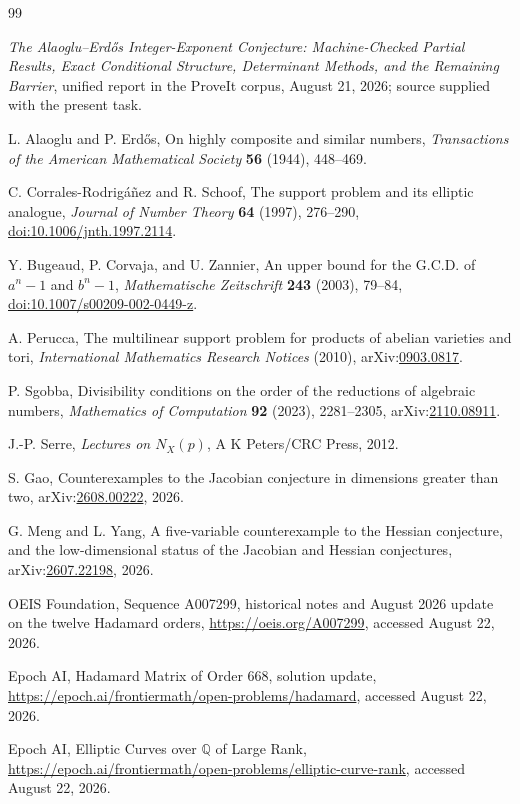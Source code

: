 \documentclass[11pt]{article}
\theoremstyle{definition}
\newcommand{\Q}{\mathbb Q}
\begin{document}
\begin{thebibliography}{99}

\emph{The Alaoglu--Erd\H{o}s Integer-Exponent Conjecture: Machine-Checked Partial Results,
Exact Conditional Structure, Determinant Methods, and the Remaining Barrier}, unified report
in the ProveIt corpus, August 21, 2026; source supplied with the present task.

L. Alaoglu and P. Erd\H{o}s,
On highly composite and similar numbers,
\emph{Transactions of the American Mathematical Society} \textbf{56} (1944), 448--469.

C. Corrales-Rodrig\'a\~nez and R. Schoof,
The support problem and its elliptic analogue,
\emph{Journal of Number Theory} \textbf{64} (1997), 276--290,
\href{https://doi.org/10.1006/jnth.1997.2114}{doi:10.1006/jnth.1997.2114}.

Y. Bugeaud, P. Corvaja, and U. Zannier,
An upper bound for the G.C.D. of $a^n-1$ and $b^n-1$,
\emph{Mathematische Zeitschrift} \textbf{243} (2003), 79--84,
\href{https://doi.org/10.1007/s00209-002-0449-z}{doi:10.1007/s00209-002-0449-z}.

A. Perucca,
The multilinear support problem for products of abelian varieties and tori,
\emph{International Mathematics Research Notices} (2010),
arXiv:\href{https://arxiv.org/abs/0903.0817}{0903.0817}.

P. Sgobba,
Divisibility conditions on the order of the reductions of algebraic numbers,
\emph{Mathematics of Computation} \textbf{92} (2023), 2281--2305,
arXiv:\href{https://arxiv.org/abs/2110.08911}{2110.08911}.

J.-P. Serre,
\emph{Lectures on $N_X(p)$},
A K Peters/CRC Press, 2012.

S. Gao,
Counterexamples to the Jacobian conjecture in dimensions greater than two,
arXiv:\href{https://arxiv.org/abs/2608.00222}{2608.00222}, 2026.

G. Meng and L. Yang,
A five-variable counterexample to the Hessian conjecture, and the low-dimensional status of
the Jacobian and Hessian conjectures,
arXiv:\href{https://arxiv.org/abs/2607.22198}{2607.22198}, 2026.

OEIS Foundation,
Sequence A007299, historical notes and August 2026 update on the twelve Hadamard orders,
\url{https://oeis.org/A007299}, accessed August 22, 2026.

Epoch AI,
Hadamard Matrix of Order 668, solution update,
\url{https://epoch.ai/frontiermath/open-problems/hadamard}, accessed August 22, 2026.

Epoch AI,
Elliptic Curves over $\Q$ of Large Rank,
\url{https://epoch.ai/frontiermath/open-problems/elliptic-curve-rank}, accessed August 22, 2026.

\end{thebibliography}
\end{document}
